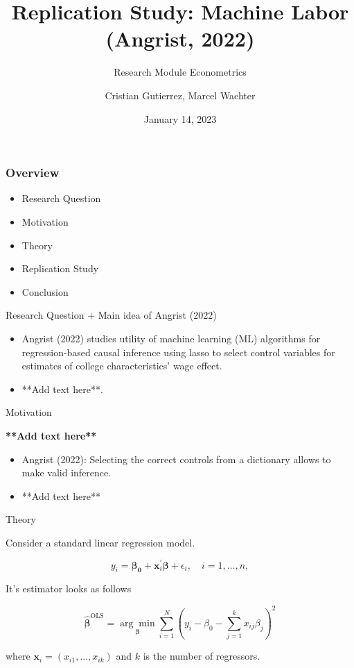 \documentclass{beamer}
\title{Replication Study: Machine Labor (Angrist, 2022)}
\subtitle {Research Module Econometrics}
\author{Cristian Gutierrez, Marcel Wachter}
\date{January 14, 2023}
\begin{document}
\maketitle

\begin{frame}
\frametitle{Overview} 

\begin{itemize}
    

\item Research Question
\item Motivation
\item Theory
\item Replication Study
\item Conclusion
\end{itemize}
\end{frame}


\begin{frame} {Research Question + Main idea of Angrist (2022)}
\begin{itemize}

\item  Angrist (2022) studies utility of machine learning (ML) algorithms for regression-based causal inference using lasso to select control variables for estimates of college characteristics' wage effect.
\item **Add text here**.
\end{itemize}

\end{frame}






\begin{frame}{Motivation}

\flushleft \textbf{**Add text here**}
\vspace{4mm}
\begin{itemize}
    \item Angrist (2022): Selecting the correct controls from a dictionary allows to make valid inference.
    \item **Add text here**
\end{itemize}

\end{frame}


\begin{frame}{Theory}
\begin{flushleft}
\item Consider a standard linear regression model. 
\end{flushleft}
\[
    y_i=\boldsymbol{\beta_0} +\mathbf{x}_i^\prime \boldsymbol{\beta}+\epsilon_i, \quad i = 1, \ldots, n,
    \tag{1}
\]
\begin{flushleft}
It's estimator looks as follows
\end{flushleft}
\[
\hat{\boldsymbol{\beta}}^{\text{OLS}}=\underset{\boldsymbol{\beta}}{\arg \min}\sum_{i=1}^N (y_i-\beta_0-\sum_{j=1}^k x_{i j}\beta_j)^2
    \tag{2}
\]
\begin{flushleft}
where $\mathbf{x}_i=(x_{i1}, ..., x_{ik})$ and $k$ is the number of regressors.
\end{flushleft}
\end{frame}
\end{document}
